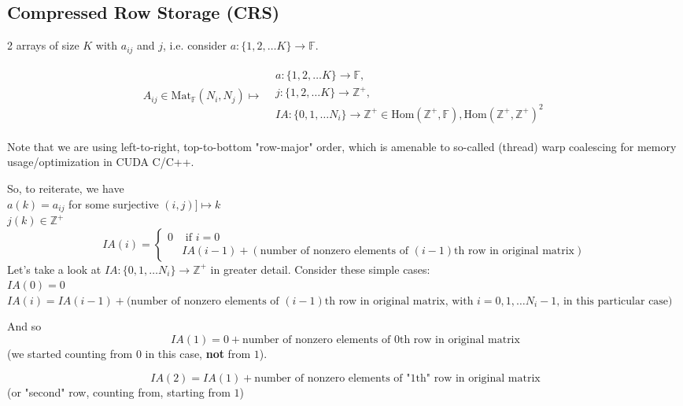 \documentclass[10pt]{amsart}
\begin{document}
\begin{multicols*}{2}
\subsection{Compressed Row Storage (CRS)  }

2 arrays of size $K$ with $a_{ij}$ and $j$, i.e. consider $a: \lbrace 1, 2 , \dots K \rbrace \to \mathbb{F}$.  

\begin{equation}
\begin{gathered}
A_{ij} \in \text{Mat}_{\mathbb{F}}(N_i , N_j) \mapsto \begin{aligned} 
	& a:\lbrace 1,2, \dots K \rbrace \to \mathbb{F}, \, \\ 
	& j : \lbrace 1,2, \dots K \rbrace \to \mathbb{Z}^+ , \, \\
	& IA: \lbrace 0 ,1,\dots N_i \rbrace \to \mathbb{Z}^+ \in \text{Hom}(\mathbb{Z}^+,\mathbb{F}), \text{Hom}(\mathbb{Z}^+,\mathbb{Z}^+)^2
\end{aligned}
\end{gathered}
\end{equation}

Note that we are using left-to-right, top-to-bottom "row-major" order, which is amenable to so-called (thread) warp coalescing for memory usage/optimization in CUDA C/C++.  

So, to reiterate, we have \\
$a(k) = a_{ij}$ for some surjective $(i,j) ]\mapsto k$ \\
$j(k) \in \mathbb{Z}^+$ 
\[
IA(i) = \begin{cases}0  & \text{ if } i = 0 \\
& IA(i-1) + (\text{number of nonzero elements of $(i-1)$th row in original matrix}) \end{cases}
\]
Let's take a look at $IA: \lbrace 0,1,\dots N_i \rbrace \to \mathbb{Z}^+$ in greater detail.  Consider these simple cases:  \\
$IA(0)= 0$ \\
$IA(i) = IA(i-1) + (\text{number of nonzero elements of $(i-1)$th row in original matrix, with $i=0,1,\dots N_i-1$, in this particular case)}$

And so 
\[
IA(1) = 0+\text{number of nonzero elements of $0$th row in original matrix}
\]
(we started counting from $0$ in this case, \textbf{not} from $1$).  

\[
IA(2) = IA(1)+\text{number of nonzero elements of "$1$th" row in original matrix}
\]
(or "second" row, counting from, starting from $1$) 


\end{multicols*}
\end{document}
